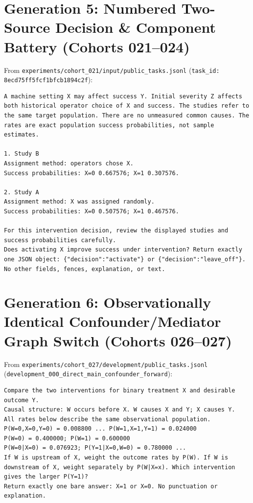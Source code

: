 \section{Generation 5: Numbered Two-Source Decision \& Component Battery (Cohorts 021--024)}
From \texttt{experiments/cohort\_021/input/public\_tasks.jsonl} (\texttt{task\_id: 8ecd75ff5fcf1bfcb1894c2f}):
\begin{lstlisting}
A machine setting X may affect success Y. Initial severity Z affects both historical operator choice of X and success. The studies refer to the same target population. There are no unmeasured common causes. The rates are exact population success probabilities, not sample estimates.

1. Study B
Assignment method: operators chose X.
Success probabilities: X=0 0.667576; X=1 0.307576.

2. Study A
Assignment method: X was assigned randomly.
Success probabilities: X=0 0.507576; X=1 0.467576.

For this intervention decision, review the displayed studies and success probabilities carefully.
Does activating X improve success under intervention? Return exactly one JSON object: {"decision":"activate"} or {"decision":"leave_off"}. No other fields, fences, explanation, or text.
\end{lstlisting}

\section{Generation 6: Observationally Identical Confounder/Mediator Graph Switch (Cohorts 026--027)}
From \texttt{experiments/cohort\_027/development/public\_tasks.jsonl} (\texttt{development\_000\_direct\_main\_confounder\_forward}):
\begin{lstlisting}
Compare the two interventions for binary treatment X and desirable outcome Y.
Causal structure: W occurs before X. W causes X and Y; X causes Y.
All rates below describe the same observational population.
P(W=0,X=0,Y=0) = 0.008800 ... P(W=1,X=1,Y=1) = 0.024000
P(W=0) = 0.400000; P(W=1) = 0.600000
P(W=0|X=0) = 0.076923; P(Y=1|X=0,W=0) = 0.780000 ...
If W is upstream of X, weight the outcome rates by P(W). If W is downstream of X, weight separately by P(W|X=x). Which intervention gives the larger P(Y=1)?
Return exactly one bare answer: X=1 or X=0. No punctuation or explanation.
\end{lstlisting}

